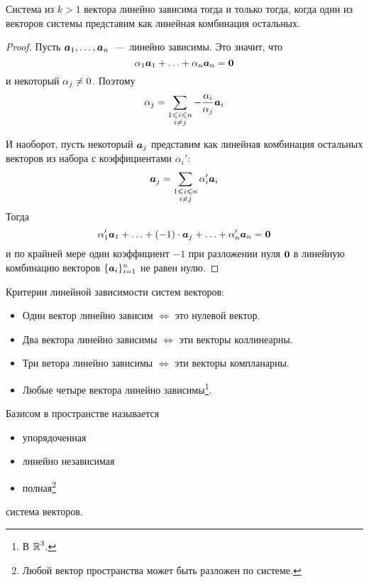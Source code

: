 \documentclass[a4paper,12pt]{article}
\begin{document}
  \begin{theorem}
    Система из $k > 1$ вектора линейно зависима тогда и только тогда, когда один из векторов системы представим как линейная комбинация остальных.
  \end{theorem}
  
  \begin{proof}
    Пусть $\boldsymbol a_1, \ldots, \boldsymbol a_n$~---~линейно зависимы.
    Это значит, что
    \[
      \alpha_1 \boldsymbol a_1 + \ldots + \alpha_n \boldsymbol a_n = \boldsymbol 0
    \]
    и некоторый $\alpha_j \hm{\not=} 0$.
    Поэтому
    \[
      \alpha_j = \sum\limits_{\substack{1 \leqslant i \leqslant n\\i \not= j}} -\frac{\alpha_i}{\alpha_j} \boldsymbol a_i
    \]
    
    И наоборот, пусть некоторый $\boldsymbol a_j$ представим как линейная комбинация остальных векторов из набора с коэффициентами $\alpha_i'$:
    \[
      \boldsymbol a_j = \sum\limits_{\substack{1 \leqslant i \leqslant n\\i \not= j}} \alpha_i' \boldsymbol a_i
    \]
    Тогда
    \[
      \alpha_1' \boldsymbol a_1 + \ldots + (-1) \cdot \boldsymbol a_j + \ldots + \alpha_n' \boldsymbol a_n = \boldsymbol 0
    \]
    и по крайней мере один коэффициент $-1$ при разложении нуля $\boldsymbol 0$ в линейную комбинацию векторов $\{\boldsymbol a_i\}_{i=1}^n$ не равен нулю.
  \end{proof}
  
  \begin{theorem}\label{theo:linear-dependence-criteria}
    Критерии линейной зависимости систем векторов:
    \begin{itemize}
      \item Один вектор линейно зависим $\Leftrightarrow$ это нулевой вектор.
      \item Два вектора линейно зависимы $\Leftrightarrow$ эти векторы коллинеарны.
      \item Три ветора линейно зависимы $\Leftrightarrow$ эти векторы компланарны.
      \item Любые четыре вектора линейно зависимы\footnote{В $\operatorname{\mathbb R}^3$.}.
    \end{itemize}
  \end{theorem}
  
  \begin{definition}[Базис]
    Базисом в пространстве называется
    \begin{itemize}
      \item упорядоченная
      \item линейно независимая
      \item полная\footnote{Любой вектор пространства может быть разложен по системе.}
    \end{itemize}
    система векторов.
  \end{definition}
  
\end{document}
